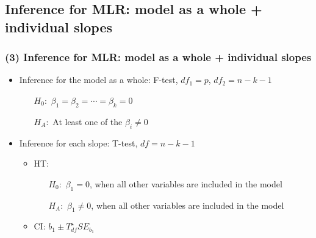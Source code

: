 \documentclass[slidestop,compress,mathserif,12pt,t,professionalfonts,xcolor=table]{beamer}
\begin{document}

\subsection{Inference for MLR: model as a whole + individual slopes}
\label{mi3}


\begin{frame}
\frametitle{(3) Inference for MLR: model as a whole + individual slopes}

\begin{itemize}

\item Inference for the model as a whole: F-test, $df_1 = p$, $df_2 = n - k - 1$
\begin{itemize}
\item[$H_0:$] $\beta_1 = \beta_2 = \cdots = \beta_k = 0$
\item[$H_A:$] At least one of the $\beta_i \ne 0$
\end{itemize}

\pause

\item Inference for each slope: T-test, $df = n - k - 1$
\begin{itemize}
\item HT:
\begin{itemize}
\item[$H_0:$] $\beta_1 = 0$, when all other variables are included in the model
\item[$H_A:$] $\beta_1 \ne 0$, when all other variables are included in the model
\end{itemize}
\item CI: $b_1 \pm T^\star_{df} SE_{b_1}$
\end{itemize}

\end{itemize}

\end{frame}

\end{document}
